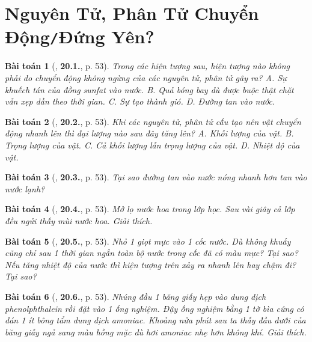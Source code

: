 \documentclass{article}
\numberwithin{equation}{section}
\newtheorem{baitoan}{Bài toán}
\begin{document}

\section{Nguyên Tử, Phân Tử Chuyển Động\texttt{/}Đứng Yên?}

\begin{baitoan}[\cite{SBT_Vat_Ly_8}, \textbf{20.1.}, p. 53]
	Trong các hiện tượng sau, hiện tượng nào không phải do chuyển động không ngừng của các nguyên tử, phân tử gây ra? {\sf A.} Sự khuếch tán của đồng sunfat vào nước. {\sf B.} Quả bóng bay dù được buộc thật chặt vẫn xẹp dần theo thời gian. {\sf C.} Sự tạo thành gió. {\sf D.} Đường tan vào nước.
\end{baitoan}

\begin{baitoan}[\cite{SBT_Vat_Ly_8}, \textbf{20.2.}, p. 53]
	Khi các nguyên tử, phân tử cấu tạo nên vật chuyển động nhanh lên thì đại lượng nào sau đây tăng lên? {\sf A.} Khối lượng của vật. {\sf B.} Trọng lượng của vật. {\sf C.} Cả khối lượng lẫn trọng lượng của vật. {\sf D.} Nhiệt độ của vật.
\end{baitoan}

\begin{baitoan}[\cite{SBT_Vat_Ly_8}, \textbf{20.3.}, p. 53]
	Tại sao đường tan vào nước nóng nhanh hơn tan vào nước lạnh?
\end{baitoan}

\begin{baitoan}[\cite{SBT_Vat_Ly_8}, \textbf{20.4.}, p. 53]
	Mở lọ nước hoa trong lớp học. Sau vài giây cả lớp đều ngửi thấy mùi nước hoa. Giải thích.
\end{baitoan}

\begin{baitoan}[\cite{SBT_Vat_Ly_8}, \textbf{20.5.}, p. 53]
	Nhỏ 1 giọt mực vào 1 cốc nước. Dù không khuấy cũng chỉ sau 1 thời gian ngắn toàn bộ nước trong cốc đã có màu mực? Tại sao? Nếu tăng nhiệt độ của nước thì hiện tượng trên xảy ra nhanh lên hay chậm đi? Tại sao?
\end{baitoan}

\begin{baitoan}[\cite{SBT_Vat_Ly_8}, \textbf{20.6.}, p. 53]
	Nhúng đầu 1 băng giấy hẹp vào dung dịch phenolphthalein rồi đặt vào 1 ống nghiệm. Đậy ống nghiệm bằng 1 tờ bìa cứng có dán 1 ít bông tẩm dung dịch amoniac. Khoảng nửa phút sau ta thấy đầu dưới của băng giấy ngả sang màu hồng mặc dù hơi amoniac nhẹ hơn không khí. Giải thích.
\end{baitoan}
\end{document}
